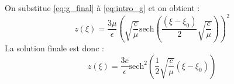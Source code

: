 \documentclass[11pt,a4paper]{article}
\begin{document}
On substitue \eqref{eq:g_final} à \eqref{eq:intro_g} et on obtient :
\[ z(\xi) = \frac{3\mu}{\epsilon} \left( \sqrt{\frac{c}{\mu}} \text{sech}\left( \frac{(\xi - \xi_0)}{2} \sqrt{\frac{c}{\mu}} \right) \right)^2 \]
La solution finale est donc :
\[ \boxed{z(\xi) = \frac{3c}{\epsilon} \text{sech}^2\left( \frac{1}{2}\sqrt{\frac{c}{\mu}}(\xi - \xi_0) \right)} \]
\end{document}
